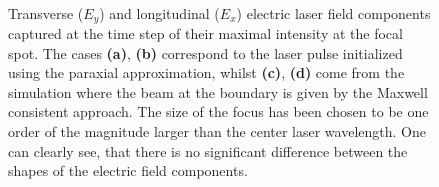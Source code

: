 \begin{figure}[h!]
	\centering
	\hspace{2mm}
	\\
	\hspace{2mm}
	\caption{Transverse ($ E_{y} $) and longitudinal ($ E_{x} $) electric laser field components captured at the time step of their maximal intensity at the focal spot. The cases \textbf{(a)}, \textbf{(b)} correspond to the laser pulse initialized using the paraxial approximation, whilst \textbf{(c)}, \textbf{(d)} come from the simulation where the beam at the boundary is given by the Maxwell consistent approach. The size of the focus has been chosen to be one order of the magnitude larger than the center laser wavelength. One can clearly see, that there is no significant difference between the shapes of the electric field components.}
	\label{fig:5}
\end{figure}

